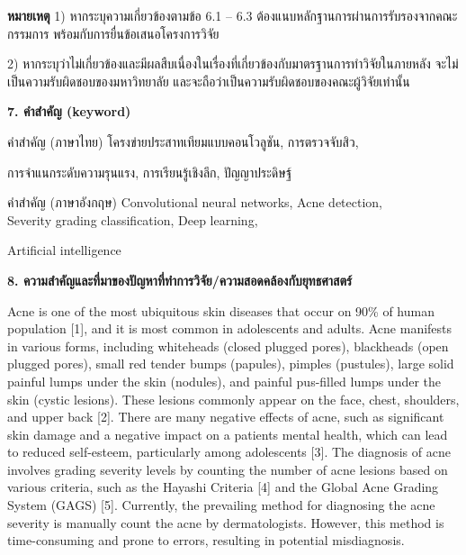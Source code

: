 \documentclass[16pt]{extarticle}
\begin{document}
\textbf{หมายเหตุ} 1) หากระบุความเกี่ยวข้องตามข้อ 6.1 -- 6.3
ต้องแนบหลักฐานการผ่านการรับรองจากคณะกรรมการ พร้อมกับการยื่นข้อเสนอโครงการวิจัย

2) หากระบุว่าไม่เกี่ยวข้องและมีผลสืบเนื่องในเรื่องที่เกี่ยวข้องกับมาตรฐานการทำวิจัยในภายหลัง
จะไม่เป็นความรับผิดชอบของมหาวิทยาลัย และจะถือว่าเป็นความรับผิดชอบของคณะผู้วิจัยเท่านั้น

\textbf{7. คำสำคัญ (keyword)}

คำสำคัญ (ภาษาไทย) โครงข่ายประสาทเทียมแบบคอนโวลูชัน, การตรวจจับสิว,

การจำแนกระดับความรุนแรง, การเรียนรู้เชิงลึก, ปัญญาประดิษฐ์

คำสำคัญ (ภาษาอังกฤษ) Convolutional neural networks, Acne detection,\\
Severity grading classification, Deep learning,

Artificial intelligence

\textbf{8. ความสำคัญและที่มาของปัญหาที่ทำการวิจัย/ความสอดคล้องกับยุทธศาสตร์}

Acne is one of the most ubiquitous skin diseases that occur on 90\% of
human population {[}1{]}, and it is most common in adolescents and
adults. Acne manifests in various forms, including whiteheads (closed
plugged pores), blackheads (open plugged pores), small red tender bumps
(papules), pimples (pustules), large solid painful lumps under the skin
(nodules), and painful pus-filled lumps under the skin (cystic lesions).
These lesions commonly appear on the face, chest, shoulders, and upper
back {[}2{]}. There are many negative effects of acne, such as
significant skin damage and a negative impact on a
patient\textquotesingle s mental health, which can lead to reduced
self-esteem, particularly among adolescents {[}3{]}. The diagnosis of
acne involves grading severity levels by counting the number of acne
lesions based on various criteria, such as the Hayashi Criteria {[}4{]}
and the Global Acne Grading System (GAGS) {[}5{]}. Currently, the
prevailing method for diagnosing the acne severity is manually count the
acne by dermatologists. However, this method is time-consuming and prone
to errors, resulting in potential misdiagnosis.
\end{document}
